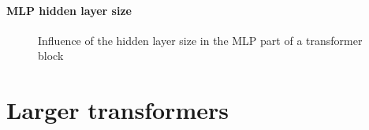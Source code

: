 \paragraph{MLP hidden layer size}

\begin{figure}[H]
    \centering
    \caption{Influence of the hidden layer size in the MLP part of a transformer block}
    \label{fig:mlp_ratio_influence}
\end{figure}


\section{Larger transformers}